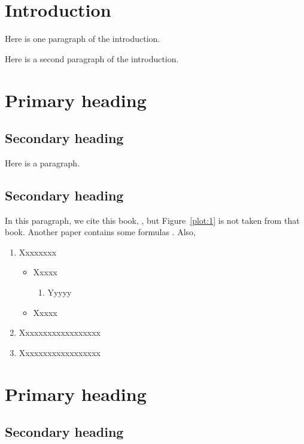 \documentclass[a4paper,11pt]{template/style/uneceart}
\begin{document}


\section{Introduction}  %

Here is one paragraph of the introduction.

Here is a second paragraph of the introduction.

\section{Primary heading}
\subsection{Secondary heading} \label{sc:A}
Here is a paragraph.


\subsection{Secondary heading} \label{sc:B}
In this paragraph, we cite this book,
\cite{Hundepoolea2012}, but Figure~\ref{plot:1} is not taken from that book. Another paper contains some formulas \citep[see][]{Zhou2010Smoothing}. Also,
\begin{enumerate}
\item Xxxxxxxx
\begin{itemize}
\item Xxxxx
\begin{enumerate}
\item Yyyyy
\end{enumerate}
\item Xxxxx
\end{itemize}
\item Xxxxxxxxxxxxxxxxxx
\item Xxxxxxxxxxxxxxxxxx
\end{enumerate}


\section{Primary heading}

\subsection{Secondary heading}
\end{document}
